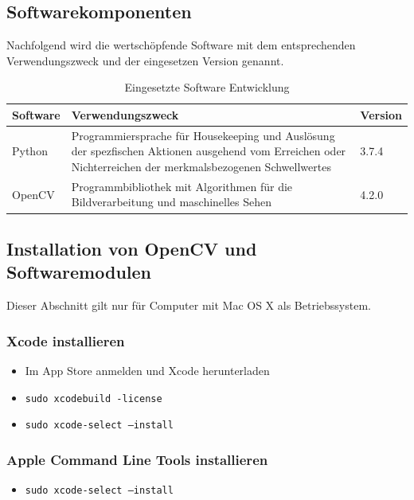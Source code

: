 \subsection{Softwarekomponenten}
Nachfolgend wird die wertschöpfende Software mit dem entsprechenden Verwendungszweck und der eingesetzen Version genannt.
\begin{table}[H]
	
	\begin{tabular}{p{3cm} p{8cm} p{3cm} }
		
		\toprule[1pt]
		\rowcolor{maroon!30}
		
		Software & Verwendungszweck & Version\\
		
		\midrule 
		Python  & Programmiersprache für Housekeeping und Auslösung der spezfischen Aktionen ausgehend vom Erreichen oder Nichterreichen der merkmalsbezogenen Schwellwertes & 3.7.4\\
		OpenCV &  Programmbibliothek mit Algorithmen für die Bildverarbeitung und maschinelles Sehen & 4.2.0 \\ 		

		\bottomrule
	\end{tabular}
	\caption{Eingesetzte Software Entwicklung}
	\label{fig: Eingesetzte Software Entwicklung}
\end{table}

\subsection{Installation von OpenCV und Softwaremodulen}
Dieser Abschnitt gilt nur für Computer mit Mac OS X als Betriebssystem.
\subsubsection{Xcode installieren} 
\begin{itemize}
	\item Im App Store anmelden und Xcode herunterladen
	\item \texttt{sudo xcodebuild -license}
	\item \texttt{sudo xcode-select --install}
\end{itemize}

\subsubsection{Apple Command Line Tools installieren} 
\begin{itemize}
	\item \texttt{sudo xcode-select --install}
\end{itemize}

